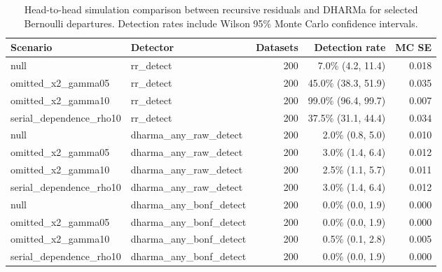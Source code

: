 \begin{table}[H]
\centering
\caption{Head-to-head simulation comparison between recursive residuals and DHARMa for selected Bernoulli departures. Detection rates include Wilson 95\% Monte Carlo confidence intervals.}
\label{tab:dharma-head-to-head-bernoulli}
\begin{tabular}{llrrr}
\toprule
Scenario & Detector & Datasets & Detection rate & MC SE \\
\midrule
null & rr_detect & 200 & 7.0\% (4.2, 11.4) & 0.018 \\
omitted_x2_gamma05 & rr_detect & 200 & 45.0\% (38.3, 51.9) & 0.035 \\
omitted_x2_gamma10 & rr_detect & 200 & 99.0\% (96.4, 99.7) & 0.007 \\
serial_dependence_rho10 & rr_detect & 200 & 37.5\% (31.1, 44.4) & 0.034 \\
null & dharma_any_raw_detect & 200 & 2.0\% (0.8, 5.0) & 0.010 \\
omitted_x2_gamma05 & dharma_any_raw_detect & 200 & 3.0\% (1.4, 6.4) & 0.012 \\
omitted_x2_gamma10 & dharma_any_raw_detect & 200 & 2.5\% (1.1, 5.7) & 0.011 \\
serial_dependence_rho10 & dharma_any_raw_detect & 200 & 3.0\% (1.4, 6.4) & 0.012 \\
null & dharma_any_bonf_detect & 200 & 0.0\% (0.0, 1.9) & 0.000 \\
omitted_x2_gamma05 & dharma_any_bonf_detect & 200 & 0.0\% (0.0, 1.9) & 0.000 \\
omitted_x2_gamma10 & dharma_any_bonf_detect & 200 & 0.5\% (0.1, 2.8) & 0.005 \\
serial_dependence_rho10 & dharma_any_bonf_detect & 200 & 0.0\% (0.0, 1.9) & 0.000 \\
\bottomrule
\end{tabular}
\end{table}
